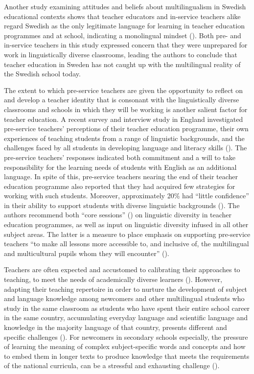\documentclass[output=paper]{langscibook}
\begin{document}
Another study examining attitudes and beliefs about multilingualism in Swedish educational contexts shows that teacher educators and in-service teachers alike regard Swedish as the only legitimate language for learning in teacher education programmes and at school, indicating a monolingual mindset (\citealt{PaulsrudEtAl2023}). Both pre- and in-service teachers in this study expressed concern that they were unprepared for work in linguistically diverse classrooms, leading the authors to conclude that teacher education in Sweden has not caught up with the multilingual reality of the Swedish school today.

The extent to which pre-service teachers are given the opportunity to reflect on and develop a teacher identity that is consonant with the linguistically diverse classrooms and schools in which they will be working is another salient factor for teacher education. A recent survey and interview study in England investigated pre-service teachers’ perceptions of their teacher education programme, their own experiences of teaching students from a range of linguistic backgrounds, and the challenges faced by all students in developing language and literacy skills (\citealt{FoleyEtAl2022}). The pre-service teachers’ responses indicated both commitment and a will to take responsibility for the learning needs of students with English as an additional language. In spite of this, pre-service teachers nearing the end of their teacher education programme also reported that they had acquired few strategies for working with such students. Moreover, approximately 20\% had “little confidence” in their ability to support students with diverse linguistic backgrounds (\citealt[117]{FoleyEtAl2022}). The authors recommend both “core sessions” (\citealt[120]{FoleyEtAl2022}) on linguistic diversity in teacher education programmes, as well as {i}nput on linguistic diversity infused in all other subject areas. The latter is a measure to place emphasis on supporting pre-service teachers “to make all lessons more accessible to, and inclusive of, the multilingual and multicultural pupils whom they will encounter” (\citealt[120]{FoleyEtAl2022}).

\begin{sloppypar}
Teachers are often expected and accustomed to calibrating their approaches to teaching, to meet the needs of academically diverse learners (\citealt{Cochran-SmithEtAl2015}). However, adapting their teaching repertoire in order to nurture the development of subject and language knowledge among newcomers and other multilingual students who study in the same classroom as students who have spent their entire school career in the same country, accumulating everyday language and scientific language and knowledge in the majority language of that country, presents different and specific challenges (\citealt{WernickeEtAl2021}). For newcomers in secondary schools especially, the pressure of learning the meaning of complex subject-specific words and concepts and how to embed them in longer texts to produce knowledge that meets the requirements of the national curricula, can be a stressful and exhausting challenge (\citealt{Sharif2017}).
\end{sloppypar}
\end{document}
